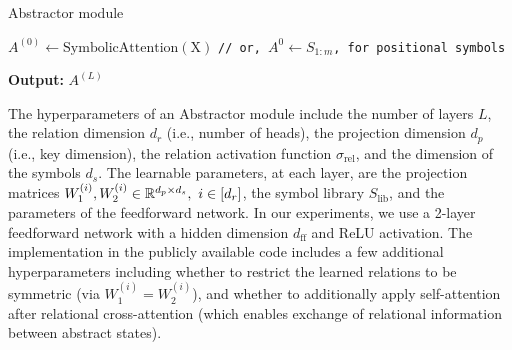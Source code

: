\begin{algorithm}[ht!]
	\caption{Abstractor module}\label{alg:abstractor_module}

	\vspace{1em}

    $A^{(0)} \gets \mathrm{SymbolicAttention(X)}$ \quad \texttt{// or, $A^{0} \gets S_{1:m}$, for positional symbols}


    \textbf{Output:} $A^{(L)}$

\end{algorithm}

The hyperparameters of an Abstractor module include the number of layers $L$, the relation dimension $d_r$ (i.e., number of heads),  the projection dimension $d_p$ (i.e., key dimension), the relation activation function $\sigma_{\mathrm{rel}}$, and the dimension of the symbols $d_s$. The learnable parameters, at each layer, are the projection matrices $W_1^{(i)}, W_2^{(i)} \in \mathbb{R}^{d_p \times d_s}, \ i \in [d_r]$, the symbol library $S_{\mathrm{lib}}$, and the parameters of the feedforward network. In our experiments, we use a 2-layer feedforward network with a hidden dimension $d_{\mathrm{ff}}$ and ReLU activation. The implementation in the publicly available code includes a few additional hyperparameters including whether to restrict the learned relations to be symmetric (via $W_1^{(i)} = W_2^{(i)}$), and whether to additionally apply self-attention after relational cross-attention (which enables exchange of relational information between abstract states).

